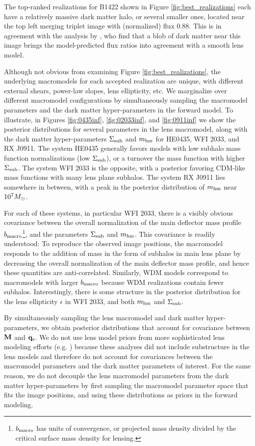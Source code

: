 The top-ranked realizations for B1422 shown in Figure \ref{fig:best_realizations} each have a relatively massive dark matter halo, or several smaller ones, located near the top left merging triplet image with (normalized) flux 0.88. This is in agreement with the analysis by \cite{Nierenberg++14}, who find that a blob of dark matter near this image brings the model-predicted flux ratios into agreement with a smooth lens model. 

Although not obvious from examining Figure \ref{fig:best_realizations}, the underlying macromodels for each accepted realization are unique, with different external shears, power-law slopes, lens ellipticity, etc. We marginalize over different macromodel configurations by simultaneously sampling the macromodel parameters and the dark matter hyper-parameters in the forward model. To illustrate, in Figures \ref{fig:0435inf}, \ref{fig:02033inf}, and \ref{fig:0911inf} we show the posterior distributions for several parameters in the lens macromodel, along with the dark matter hyper-parameters $\Sigma_{\rm{sub}}$ and ${m_{\rm{hm}}}$ for HE0435, WFI 2033, and RX J0911. The system HE0435 generally favors models with low subhalo mass function normalizations (low $\Sigma_{\rm{sub}}$), or a turnover the mass function with higher $\Sigma_{\rm{sub}}$. The system WFI 2033 is the opposite, with a posterior favoring CDM-like mass functions with many lens plane subhalos. The system RX J0911 lies somewhere in between, with a peak in the posterior distribution of ${m_{\rm{hm}}}$ near $10^{7} {M_{\odot}}$. 

For each of these systems, in particular WFI 2033, there is a visibly obvious covariance between the overall normalization of the main deflector mass profile $b_{\rm{macro}}$\footnote{$b_{\rm{macro}}$ has units of convergence, or projected mass density divided by the critical surface mass density for lensing.}, and the parameters $\Sigma_{\rm{sub}}$ and ${m_{\rm{hm}}}$. This covariance is readily understood: To reproduce the observed image positions, the macromodel responds to the addition of mass in the form of subhalos in main lens plane by decreasing the overall normalization of the main deflector mass profile, and hence these quantities are anti-correlated. Similarly, WDM models correspond to macromodels with larger $b_{\rm{macro}}$ because WDM realizations contain fewer subhalos. Interestingly, there is some structure in the posterior distribution for the lens ellipticity $\epsilon$ in WFI 2033, and both ${m_{\rm{hm}}}$ and $\Sigma_{\rm{sub}}$. 

By simultaneously sampling the lens macromodel and dark matter hyper-parameters, we obtain posterior distributions that account for covariance between ${\bf{M}}$ and ${\bf{q}_{\rm{s}}}$. We do not use lens model priors from more sophisticated lens modeling efforts (e.g. \cite{Wong++17,Shajib++18}) because these analyses did not include substructure in the lens models and therefore do not account for covariances between the macromodel parameters and the dark matter parameters of interest. For the same reason, we do not decouple the lens macromodel parameters from the dark matter hyper-parameters by first sampling the macromodel parameter space that fits the image positions, and using these distributions as priors in the forward modeling. 

